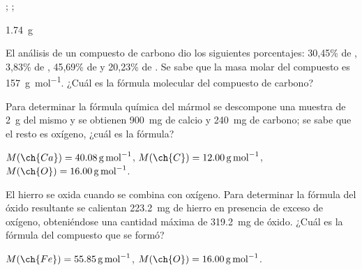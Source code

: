 \begin{solution}
  \begin{enumerate*}
    \item {}; ;
    \item \SI{1.74}{\gram}
  \end{enumerate*}
\end{solution}




\begin{exercise}[
    tags    = {termodinámica, entalpía, entalpia de reacción, calor},
    topics  = {química, termoquímica, termodinámica},
    source  = {FQ 1B OXF 2015, p43, e46},
  ]
  El análisis de un compuesto de carbono dio los siguientes porcentajes: 30,45\% de , 3,83\% de , 45,69\% de  y 20,23\% de . Se sabe que la masa molar del compuesto es \SI{157}{\gram\per\mole}. ¿Cuál es la fórmula molecular del compuesto de carbono?
\end{exercise}

\begin{solution}
\end{solution}




\begin{exercise}[
    tags    = {termodinámica, entalpía, entalpia de reacción, calor},
    topics  = {química, termoquímica, termodinámica},
    source  = {FQ 1B SAN 2015, p44, e52},
  ]
  Para determinar la fórmula química del mármol se descompone una muestra de \SI{2}{\gram} del mismo y se obtienen \SI{900}{\milli\gram} de calcio y \SI{240}{\milli\gram} de carbono; se sabe que el resto es oxígeno, ¿cuál es la fórmula?

  \begin{gexdatos}
    \( M(\ch{Ca}) = \SI{40.08}{\gram\per\mole} \),
    \( M(\ch{C}) = \SI{12.00}{\gram\per\mole} \),
    \( M(\ch{O}) = \SI{16.00}{\gram\per\mole} \).
  \end{gexdatos}
\end{exercise}

\begin{solution}
\end{solution}




\begin{exercise}[
    tags    = {termodinámica, entalpía, entalpia de reacción, calor},
    topics  = {química, termoquímica, termodinámica},
    source  = {FQ 1B SAN 2015, p44, e53},
  ]
  El hierro se oxida cuando se combina con oxígeno. Para determinar la fórmula del óxido resultante se calientan \SI{223.2}{\milli\gram} de hierro en presencia de exceso de oxígeno, obteniéndose una cantidad máxima de \SI{319.2}{\milli\gram} de óxido. ¿Cuál es la fórmula del compuesto que se formó?

  \begin{gexdatos}
    \( M(\ch{Fe}) = \SI{55.85}{\gram\per\mole} \),
    \( M(\ch{O}) = \SI{16.00}{\gram\per\mole} \).
  \end{gexdatos}
\end{exercise}

\begin{solution}
\end{solution}
